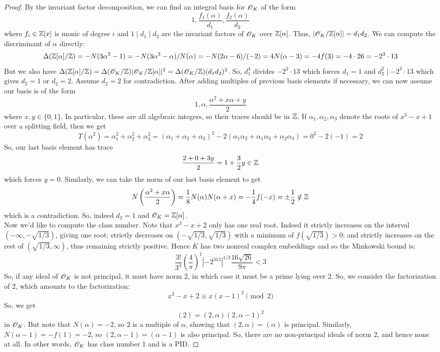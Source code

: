 \begin{proof}
	By the invariant factor decomposition, we can find an integral basis for $\mathscr{O}_K$ of the form
	\[ 1,\frac{f_1(\alpha)}{d_1},\frac{f_2(\alpha)}{d_2} \]
	where $f_i \in \mathbb{Z}[x]$ is monic of degree $i$ and $1 \mid d_1 \mid d_2$ are the invariant factors of $\mathscr{O}_K$ over $\mathbb{Z}[\alpha]$. Thus, $|\mathscr{O}_K/\mathbb{Z}[\alpha]| = d_1d_2$. We can compute the discriminant of $\alpha$ directly:
	\[ \Delta(\mathbb{Z}[\alpha]/\mathbb{Z}) = -N(3\alpha^2-1) = -N(3\alpha^3-\alpha)/N(\alpha) = -N(2\alpha-6)/(-2) = 4N(\alpha-3) = -4f(3) = -4 \cdot 26 = -2^3 \cdot 13 \]
	But we also have $\Delta(\mathbb{Z}[\alpha]/\mathbb{Z}) = \Delta(\mathscr{O}_K/\mathbb{Z})|\mathscr{O}_K/\mathbb{Z}[\alpha]|^2 = \Delta(\mathscr{O}_K/\mathbb{Z})(d_1d_2)^2$. So, $d_1^4$ divides $-2^3 \cdot 13$ which forces $d_1 = 1$ and $d_2^2 \mid -2^3 \cdot 13$ which gives $d_2 = 1$ or $d_2 = 2$. Assume $d_2 = 2$ for contradiction. After adding multiples of previous basis elements if necessary, we can now assume our basis is of the form
	\[ 1,\alpha,\frac{\alpha^2+x\alpha+y}{2} \]
	where $x,y \in \{0,1\}$. In particular, these are all algebraic integers, so their traces should be in $\mathbb{Z}$. If $\alpha_1,\alpha_2,\alpha_3$ denote the roots of $x^3-x+1$ over a splitting field, then we get
	\[ T(\alpha^2) = \alpha_1^2+\alpha_2^2+\alpha_3^2 = (\alpha_1+\alpha_2+\alpha_3)^2 - 2(\alpha_1\alpha_2 + \alpha_1\alpha_3 + \alpha_2\alpha_3) = 0^2 - 2(-1) = 2 \]
	So, our last basis element has trace
	\[ \frac{2+0+3y}{2} = 1+\frac32y \in \mathbb{Z} \]
	which forces $y = 0$. Similarly, we can take the norm of our last basis element to get
	\[ N\left(\frac{\alpha^2+x\alpha}{2}\right) = \frac{1}{8}N(\alpha)N(\alpha+x) = -\frac{1}{4}f(-x) = \pm \frac{1}{2} \notin \mathbb{Z} \]
	which is a contradiction. So, indeed $d_2 = 1$ and $\mathscr{O}_K = \mathbb{Z}[\alpha]$. \\
	
	Now we'd like to compute the class number. Note that $x^3-x+2$ only has one real root. Indeed it strictly increases on the interval $(-\infty,-\sqrt{1/3})$, giving one root; strictly decreases on $(-\sqrt{1/3},\sqrt{1/3})$ with a minimum of $f(\sqrt{1/3}) > 0$; and strictly increases on the rest of $(\sqrt{1/3},\infty)$, thus remaining strictly positive. Hence $K$ has two nonreal complex embeddings and so the Minkowski bound is:
	\[ \frac{3!}{3^3}\left(\frac4\pi\right)^1|-2^313|^{1/2} \frac{16\sqrt{26}}{9\pi} < 3 \]
	So, if any ideal of $\mathscr{O}_K$ is not principal, it must have norm 2, in which case it must be a prime lying over 2. So, we consider the factorization of 2, which amounts to the factorization:
	\[ x^3-x+2 \equiv x(x-1)^2 \pmod{2} \]
	So, we get
	\[ (2) = (2,\alpha)(2,\alpha-1)^2 \]
	in $\mathscr{O}_K$. But note that $N(\alpha) = -2$, so $2$ is a multiple of $\alpha$, showing that $(2,\alpha) = (\alpha)$ is principal. Similarly, $N(\alpha-1) = -f(1) = -2$, so $(2,\alpha-1) = (\alpha-1)$ is also principal. So, there are no non-principal ideals of norm 2, and hence none at all. In other words, $\mathscr{O}_K$ has class number 1 and is a PID.
\end{proof}
